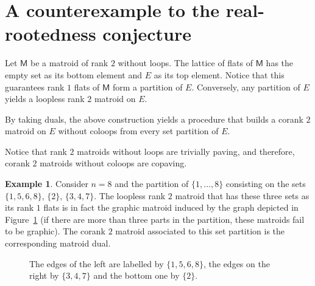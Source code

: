 \documentclass[11pt, a4paper, english]{amsart}
\theoremstyle{teoremas}
\theoremstyle{definition}
\newtheorem{example}[theorem]{Example}
\newcommand{\M}{\mathsf{M}}
\begin{document}
\section{A counterexample to the real-rootedness conjecture}

Let $\M$ be a matroid of rank $2$ without loops. The lattice of flats of $\M$ has the empty set as its bottom element and $E$ as its top element. Notice that this guarantees rank $1$ flats of $\M$ form a partition of $E$. Conversely, any partition of $E$ yields a loopless rank $2$ matroid on $E$.

By taking duals, the above construction yields a procedure that builds a corank $2$ matroid on $E$ without coloops from every set partition of $E$.

Notice that rank $2$ matroids without loops are trivially paving, and therefore, corank $2$ matroids without coloops are copaving.

\begin{example}
    Consider $n=8$ and the partition of $\{1,\ldots,8\}$ consisting on the sets $\{1,5,6,8\}$, $\{2\}$, $\{3,4,7\}$. The loopless rank $2$ matroid that has these three sets as its rank $1$ flats is in fact the graphic matroid induced by the graph depicted in Figure~\ref{fig:graph} (if there are more than three parts in the partition, these matroids fail to be graphic). The corank $2$ matroid associated to this set partition is the corresponding matroid dual.
    \begin{figure}[ht]
        \caption{The edges of the left are labelled by $\{1,5,6,8\}$, the edges on the right by $\{3,4,7\}$ and the bottom one by $\{2\}$.}\label{fig:graph}
    \end{figure}
\end{example}
\end{document}
